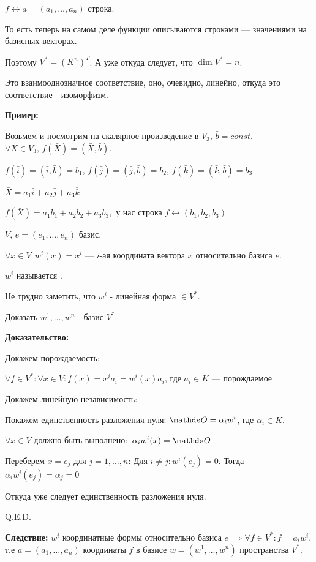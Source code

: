 $f \leftrightarrow a= (a_1,\ldots, a_n)$ строка.

То есть теперь на самом деле функции описываются строками --- значениями на базисных векторах.

Поэтому $V^* = (K^n)^T$. А уже откуда следует, что $\dim V^*  = n$.

Это взаимооднозначное соответствие, оно, очевидно, линейно, откуда это соответствие -  изоморфизм.




\textbf{Пример:}

 Возьмем и посмотрим на скалярное произведение в
$V_3, \, \bar{b}= const$. $\forall X \in V_3, \, f(\bar{X})=(\bar{X}, \bar{b})$.

$f(\bar{i})=(\bar{i}, \bar{b}) = b_1$, $f(\bar{j})=(\bar{j}, \bar{b}) = b_2$, $f(\bar{k})=(\bar{k}, \bar{b}) = b_3$

$\bar{X}=a_1\bar{i}+a_2\bar{j}+a_3\bar{k}$

$f(\bar{X})=a_1b_1+a_2b_2+a_3b_3, $ у нас строка $f \leftrightarrow (b_1,b_2,b_3)$

 $V$, $e = (e_1,\ldots, e_n)$ базис.

$\forall x \in V: w^i(x) = x^i$ --- $i$-ая координата вектора $x$ относительно базиса $e$.

$w^i$ называется .

Не трудно заметить, что $w^i$ - линейная форма $\in V^{*}$.


Доказать $w^1,\ldots,w^n$ - базис $V^*$.

\textbf{Доказательство:}

\uline{Докажем порождаемость}:

$\forall f \in V^*: \forall x \in V: f(x) = x^i a_i = w^i(x)a_i$, где $a_i \in K$ --- порождаемое

\uline{Докажем линейную независимость}:

Покажем единственность разложения нуля: $\zero = \alpha_i w^i $, где $\alpha_i \in K$.

$\forall x \in V$ должно быть выполнено: $ \, \alpha_iw^i(x)=\zero$

Переберем $x = e_j$ для $j = 1,\ldots, n$: Для $i\neq j: w^i(e_j) = 0$. Тогда $\alpha_iw^i(e_j)=\alpha_j =0$

Откуда уже следует единственность разложения нуля.

\hfill Q.E.D.

\textbf{Следствие:} $w^i$ координатные формы относительно базиса $e$
$\Rightarrow \forall f \in V^*: f = a_iw^i$, т.е $a=(a_1,\ldots,a_n)$  координаты $f$ в базисе $w = (w^1,\ldots, w^n)$ пространства $V^*$.

